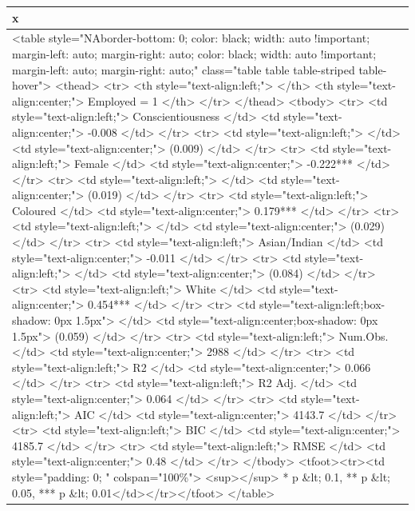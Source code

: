 
\begin{tabular}{l}
\hline
x\\
\hline
<table style="NAborder-bottom: 0; color: black; width: auto !important; margin-left: auto; margin-right: auto; color: black; width: auto !important; margin-left: auto; margin-right: auto;" class="table table table-striped table-hover">
 <thead>
  <tr>
   <th style="text-align:left;">   </th>
   <th style="text-align:center;"> Employed = 1 </th>
  </tr>
 </thead>
<tbody>
  <tr>
   <td style="text-align:left;"> Conscientiousness </td>
   <td style="text-align:center;"> -0.008 </td>
  </tr>
  <tr>
   <td style="text-align:left;">  </td>
   <td style="text-align:center;"> (0.009) </td>
  </tr>
  <tr>
   <td style="text-align:left;"> Female </td>
   <td style="text-align:center;"> -0.222*** </td>
  </tr>
  <tr>
   <td style="text-align:left;">  </td>
   <td style="text-align:center;"> (0.019) </td>
  </tr>
  <tr>
   <td style="text-align:left;"> Coloured </td>
   <td style="text-align:center;"> 0.179*** </td>
  </tr>
  <tr>
   <td style="text-align:left;">  </td>
   <td style="text-align:center;"> (0.029) </td>
  </tr>
  <tr>
   <td style="text-align:left;"> Asian/Indian </td>
   <td style="text-align:center;"> -0.011 </td>
  </tr>
  <tr>
   <td style="text-align:left;">  </td>
   <td style="text-align:center;"> (0.084) </td>
  </tr>
  <tr>
   <td style="text-align:left;"> White </td>
   <td style="text-align:center;"> 0.454*** </td>
  </tr>
  <tr>
   <td style="text-align:left;box-shadow: 0px 1.5px">  </td>
   <td style="text-align:center;box-shadow: 0px 1.5px"> (0.059) </td>
  </tr>
  <tr>
   <td style="text-align:left;"> Num.Obs. </td>
   <td style="text-align:center;"> 2988 </td>
  </tr>
  <tr>
   <td style="text-align:left;"> R2 </td>
   <td style="text-align:center;"> 0.066 </td>
  </tr>
  <tr>
   <td style="text-align:left;"> R2 Adj. </td>
   <td style="text-align:center;"> 0.064 </td>
  </tr>
  <tr>
   <td style="text-align:left;"> AIC </td>
   <td style="text-align:center;"> 4143.7 </td>
  </tr>
  <tr>
   <td style="text-align:left;"> BIC </td>
   <td style="text-align:center;"> 4185.7 </td>
  </tr>
  <tr>
   <td style="text-align:left;"> RMSE </td>
   <td style="text-align:center;"> 0.48 </td>
  </tr>
</tbody>
<tfoot><tr><td style="padding: 0; " colspan="100\%">
<sup></sup> * p \&lt; 0.1, ** p \&lt; 0.05, *** p \&lt; 0.01</td></tr></tfoot>
</table>\\
\hline
\end{tabular}
